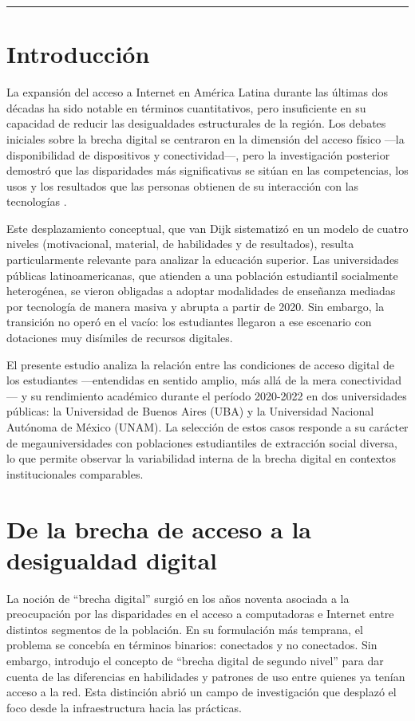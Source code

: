 \bigskip
\noindent\rule{\linewidth}{0.4pt}
\bigskip

\section{Introducción}
La expansión del acceso a Internet en América Latina durante las últimas dos décadas ha sido notable en términos cuantitativos, pero insuficiente en su capacidad de reducir las desigualdades estructurales de la región. Los debates iniciales sobre la brecha digital se centraron en la dimensión del acceso físico —la disponibilidad de dispositivos y conectividad—, pero la investigación posterior demostró que las disparidades más significativas se sitúan en las competencias, los usos y los resultados que las personas obtienen de su interacción con las tecnologías \autocite{2565-HARGITTAI2002,2562-WARSCHAUER2004}.

Este desplazamiento conceptual, que van Dijk \autocite*{2563-VANDIJK2020} sistematizó en un modelo de cuatro niveles (motivacional, material, de habilidades y de resultados), resulta particularmente relevante para analizar la educación superior. Las universidades públicas latinoamericanas, que atienden a una población estudiantil socialmente heterogénea, se vieron obligadas a adoptar modalidades de enseñanza mediadas por tecnología de manera masiva y abrupta a partir de 2020. Sin embargo, la transición no operó en el vacío: los estudiantes llegaron a ese escenario con dotaciones muy disímiles de recursos digitales.

El presente estudio analiza la relación entre las condiciones de acceso digital de los estudiantes —entendidas en sentido amplio, más allá de la mera conectividad— y su rendimiento académico durante el período 2020-2022 en dos universidades públicas: la Universidad de Buenos Aires (UBA) y la Universidad Nacional Autónoma de México (UNAM). La selección de estos casos responde a su carácter de megauniversidades con poblaciones estudiantiles de extracción social diversa, lo que permite observar la variabilidad interna de la brecha digital en contextos institucionales comparables.


\section{De la brecha de acceso a la desigualdad digital}
La noción de “brecha digital” surgió en los años noventa asociada a la preocupación por las disparidades en el acceso a computadoras e Internet entre distintos segmentos de la población. En su formulación más temprana, el problema se concebía en términos binarios: conectados y no conectados. Sin embargo, \autocite{2565-HARGITTAI2002} introdujo el concepto de “brecha digital de segundo nivel” para dar cuenta de las diferencias en habilidades y patrones de uso entre quienes ya tenían acceso a la red. Esta distinción abrió un campo de investigación que desplazó el foco desde la infraestructura hacia las prácticas.


